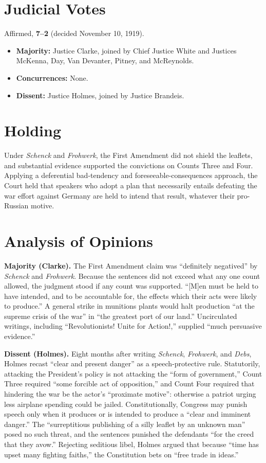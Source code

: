 \documentclass[12pt]{article}
\begin{document}
\section{Judicial Votes}

Affirmed, \textbf{7--2} (decided November 10, 1919).
\begin{itemize}
\item \textbf{Majority:} Justice Clarke, joined by Chief Justice White and Justices McKenna, Day, Van Devanter, Pitney, and McReynolds.
\item \textbf{Concurrences:} None.
\item \textbf{Dissent:} Justice Holmes, joined by Justice Brandeis.
\end{itemize}

\section{Holding}

Under \textit{Schenck} and \textit{Frohwerk}, the First Amendment did not shield the leaflets, and substantial evidence supported the convictions on Counts Three and Four. Applying a deferential bad-tendency and foreseeable-consequences approach, the Court held that speakers who adopt a plan that necessarily entails defeating the war effort against Germany are held to intend that result, whatever their pro-Russian motive.

\section{Analysis of Opinions}

\textbf{Majority (Clarke).} The First Amendment claim was ``definitely negatived'' by \textit{Schenck} and \textit{Frohwerk}. Because the sentences did not exceed what any one count allowed, the judgment stood if any count was supported. ``[M]en must be held to have intended, and to be accountable for, the effects which their acts were likely to produce.'' A general strike in munitions plants would halt production ``at the supreme crisis of the war'' in ``the greatest port of our land.'' Uncirculated writings, including ``Revolutionists! Unite for Action!,'' supplied ``much persuasive evidence.''

\textbf{Dissent (Holmes).} Eight months after writing \textit{Schenck}, \textit{Frohwerk}, and \textit{Debs}, Holmes recast ``clear and present danger'' as a speech-protective rule. Statutorily, attacking the President's policy is not attacking the ``form of government,'' Count Three required ``some forcible act of opposition,'' and Count Four required that hindering the war be the actor's ``proximate motive'': otherwise a patriot urging less airplane spending could be jailed. Constitutionally, Congress may punish speech only when it produces or is intended to produce a ``clear and imminent danger.'' The ``surreptitious publishing of a silly leaflet by an unknown man'' posed no such threat, and the sentences punished the defendants ``for the creed that they avow.'' Rejecting seditious libel, Holmes argued that because ``time has upset many fighting faiths,'' the Constitution bets on ``free trade in ideas.''
\end{document}

